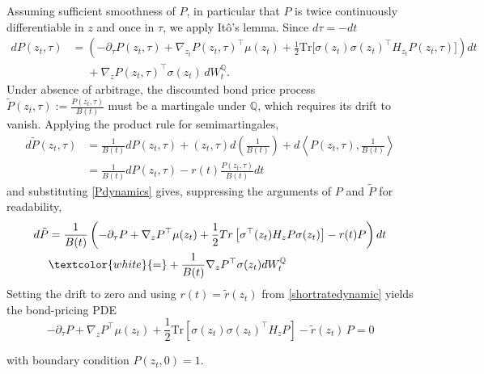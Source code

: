 Assuming sufficient smoothness of $P$, in particular that $P$ is twice continuously differentiable in $z$ and once in $\tau$, we apply Itô's lemma. Since $d\tau=-dt$
\begin{align}
dP(z_t,\tau)
&=
\left(
-\partial_\tau P(z_t,\tau)
+
\nabla_{z_t} P(z_t,\tau)^\top \mu(z_t)
+
\frac12 \mathrm{Tr}\!\big[\sigma(z_t)\sigma(z_t)^\top H_{z_t} P(z_t,\tau)\big]
\right) dt\nonumber\\
&\phantom{=}+
\nabla_z P(z_t,\tau)^\top \sigma(z_t)\, dW_t^{\mathbb Q}. 
\label{Pdynamics}
\end{align}
Under absence of arbitrage, the discounted bond price process 
\(
\tilde{P}(z_t,\tau) := \frac{P(z_t,\tau)}{B(t)}
\)
must be a martingale under $\mathbb Q$, which requires its drift to vanish. Applying the product rule for semimartingales, 
\begin{align*}
   d\tilde{P}(z_t,\tau)&=\frac{1}{B(t)}dP(z_t,\tau)+(z_t,\tau)d\left(\frac{1}{B(t)}\right)+d\left\langle P(z_t,\tau),\frac{1}{B(t)}\right\rangle \\
    &=\frac{1}{B(t)}dP(z_t,\tau)-r(t)\frac{P(z_t,\tau)}{B(t)}dt
\end{align*}
and substituting \eqref{Pdynamics} gives, suppressing the arguments of $P$ and $\tilde{P}$ for readability,
\begin{align*}
  d\tilde{P}&=\frac{1}{B(t)}\left(-\partial_\tau P+\nabla_z P^\top\mu(z_t)+\frac{1}{2}Tr\left[\sigma^\top(z_t)H_zP\sigma(z_t)\right]-r(t)P\right)dt\\
  &\textcolor{white}{=}+\frac{1}{B(t)}\nabla_zP^\top\sigma(z_t)dW_t^\mathbb{Q}  
\end{align*}
Setting the drift to zero and using $r(t)=\tilde{r}(z_t)$ from \eqref{shortratedynamic} yields the bond-pricing PDE 
\[
-\partial_\tau P
+
\nabla_z P^\top \mu(z_t)
+
\frac12 \mathrm{Tr}\!\left[\sigma(z_t)\sigma(z_t)^\top H_z P\right]
-
\tilde r(z_t)\,P
=
0
\]

with boundary condition $P(z_t,0)=1$. 

